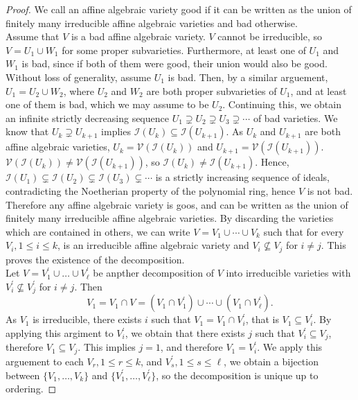 \documentclass[titlepage]{article}
\theoremstyle{remark}
\begin{document}
  \begin{proof}
    We call an affine algebraic variety good if it can be written as the union of finitely many irreducible affine algebraic varieties and bad otherwise.\\
    Assume that $V$ is a bad affine algebraic variety. $V$ cannot be irreducible, so $V=U_1\cup W_1$ for some proper subvarieties. Furthermore, at least one of $U_1$ and $W_1$ is bad, since if both of them were good, their union would also be good. Without loss of generality, assume $U_1$ is bad. Then, by a similar arguement, $U_1=U_2\cup W_2$, where $U_2$ and $W_2$ are both proper subvarieties of $U_1$, and at least one of them is bad, which we may assume to be $U_2$. Continuing this, we obtain an infinite strictly decreasing sequence $U_1\supsetneq U_2\supsetneq U_3\supsetneq\cdots$ of bad varieties. We know that $U_k\supsetneq U_{k+1}$ implies $\mathcal{I}(U_k)\subseteq\mathcal{I}(U_{k+1})$. As $U_k$ and $U_{k+1}$ are both affine algebraic varieties, $U_k=\mathcal{V}(\mathcal{I}(U_k))$ and $U_{k+1}=\mathcal{V}(\mathcal{I}(U_{k+1}))$. $\mathcal{V}(\mathcal{I}(U_{k}))\ne\mathcal{V}(\mathcal{I}(U_{k+1}))$, so $\mathcal{I}(U_k)\ne\mathcal{I}(U_{k+1})$. Hence, $\mathcal{I}(U_1)\subsetneq\mathcal{I}(U_2)\subsetneq\mathcal{I}(U_3)\subsetneq\cdots$ is a strictly increasing sequence of ideals, contradicting the Noetherian property of the polynomial ring, hence $V$ is not bad.\\
    Therefore any affine algebraic variety is goos, and can be written as the union of finitely many irreducible affine algebraic varieties. By discarding the varieties which are contained in others, we can write $V=V_1\cup\cdots\cup V_k$ such that for every $V_i,1\le i\le k$, is an irreducible affine algebraic variety and $V_i\not\subseteq V_j$ for $i\ne j$. This proves the existence of the decomposition.\\
    Let $V=V_1^\prime\cup\dots\cup V_\ell^\prime$ be anpther decomposition of $V$ into irreducible varieties with $V_i^\prime\not\subseteq V_j^\prime$ for $i\ne j$. Then
    \[V_1=V_1\cap V=(V_1\cap V_1^\prime)\cup\cdots\cup(V_1\cap V_\ell^\prime).\]
    As $V_1$ is irreducible, there exists $i$ such that $V_1=V_1\cap V_i^\prime$, that is $V_1\subseteq V_i^\prime$. By applying this argiment to $V_i^\prime$, we obtain that there exists $j$ such that $V_i^\prime\subseteq V_j$, therefore $V_1\subseteq V_j$. This implies $j=1$, and therefore $V_1=V_i^\prime$.
    We apply this arguement to each $V_r,1\le r\le k$, and $V_s^\prime,1\le s\le\ell$, we obtain a bijection between $\{V_1,\dots,V_k\}$ and $\{V_1^\prime,\dots,V_\ell^\prime\}$, so the decomposition is unique up to ordering.
  \end{proof}
\end{document}
